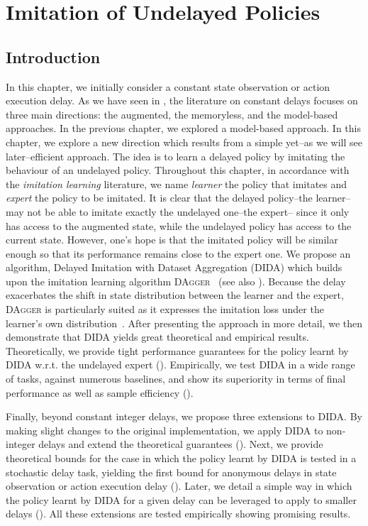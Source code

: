 \chapter{Imitation of Undelayed Policies}
\label{chap:imitation_undelayed}

\section{Introduction}
In this chapter, we initially consider a constant state observation or action execution delay. 
As we have seen in , the literature on constant delays focuses on three main directions: the augmented, the memoryless, and the model-based approaches. 
In the previous chapter, we explored a model-based approach.
In this chapter, we explore a new direction which results from a simple yet--as we will see later--efficient approach.
The idea is to learn a delayed policy by imitating the behaviour of an undelayed policy. 
Throughout this chapter, in accordance with the \emph{imitation learning} literature, we name \emph{learner} the policy that imitates and \emph{expert} the policy to be imitated.
It is clear that the delayed policy--the learner--may not be able to imitate exactly the undelayed one--the expert--
since it only has access to the augmented state, while the undelayed policy has access to the current state. 
However, one's hope is that the imitated policy will be similar enough so that its performance remains close to the expert one.
We propose an algorithm, Delayed Imitation with Dataset Aggregation (DIDA) which builds upon the {imitation learning} algorithm \textsc{DAgger}~\cite{ross2011reduction} (see also ).
Because the delay exacerbates the shift in state distribution between the learner and the expert, \textsc{DAgger} is particularly suited as it expresses the imitation loss under the learner's own distribution~\cite{osa2018algorithmic}.
After presenting the approach in more detail, we then demonstrate that DIDA yields great theoretical and empirical results. 
Theoretically, we provide tight performance guarantees for the policy learnt by DIDA w.r.t. the undelayed expert ().
Empirically, we test DIDA in a wide range of tasks, against numerous baselines, and show its superiority in terms of final performance as well as sample efficiency ().

Finally, beyond constant integer delays, we propose three extensions to DIDA.
By making slight changes to the original implementation, we apply DIDA to non-integer delays and extend the theoretical guarantees (). 
Next, we provide theoretical bounds for the case in which the policy learnt by DIDA is tested in a stochastic delay task, yielding the first bound for anonymous delays in state observation or action execution delay ().
Later, we detail a simple way in which the policy learnt by DIDA for a given delay can be leveraged to apply to smaller delays ().
All these extensions are tested empirically showing promising results.




